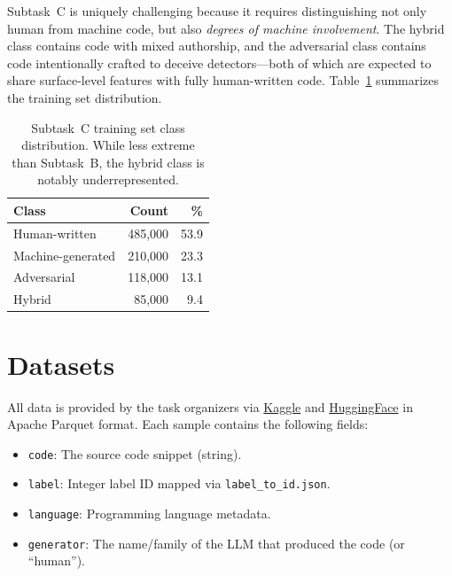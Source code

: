 \documentclass[11pt]{article}
\begin{document}
Subtask~C is uniquely challenging because it requires distinguishing not only human from machine code, but also \textit{degrees of machine involvement}. The hybrid class contains code with mixed authorship, and the adversarial class contains code intentionally crafted to deceive detectors---both of which are expected to share surface-level features with fully human-written code. Table~\ref{tab:taskC_dist} summarizes the training set distribution.

\begin{table}[ht]
\centering
\small
\begin{tabularx}{\columnwidth}{@{}l r r@{}}
\toprule
\textbf{Class} & \textbf{Count} & \textbf{\%} \\ \midrule
Human-written & 485,000 & 53.9 \\
Machine-generated & 210,000 & 23.3 \\
Adversarial & 118,000 & 13.1 \\
Hybrid & 85,000 & 9.4 \\ \bottomrule
\end{tabularx}
\caption{Subtask~C training set class distribution. While less extreme than Subtask~B, the hybrid class is notably underrepresented.}
\label{tab:taskC_dist}
\end{table}

\section{Datasets}
\label{sec:datasets}

All data is provided by the task organizers via \href{https://www.kaggle.com/datasets/daniilor/semeval-2026-task13}{Kaggle} and \href{https://huggingface.co/datasets/DaniilOr/SemEval-2026-Task13}{HuggingFace} in Apache Parquet format. Each sample contains the following fields:

\begin{itemize}
    \item \texttt{code}: The source code snippet (string).
    \item \texttt{label}: Integer label ID mapped via \texttt{label\_to\_id.json}.
    \item \texttt{language}: Programming language metadata.
    \item \texttt{generator}: The name/family of the LLM that produced the code (or ``human'').
\end{itemize}
\end{document}
